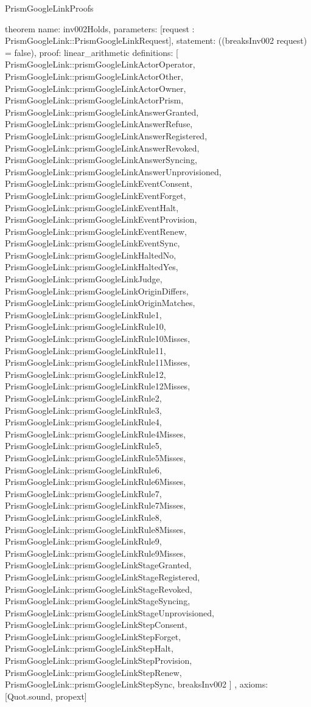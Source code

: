 \begin{lexlean}{PrismGoogleLinkProofs}
\begin{semanticmodule}
theorem{
  name: inv002Holds,
  parameters: [request : PrismGoogleLink::PrismGoogleLinkRequest],
  statement: ((breaksInv002 request) = false),
  proof: linear_arithmetic{
    definitions: [
      PrismGoogleLink::prismGoogleLinkActorOperator,
      PrismGoogleLink::prismGoogleLinkActorOther,
      PrismGoogleLink::prismGoogleLinkActorOwner,
      PrismGoogleLink::prismGoogleLinkActorPrism,
      PrismGoogleLink::prismGoogleLinkAnswerGranted,
      PrismGoogleLink::prismGoogleLinkAnswerRefuse,
      PrismGoogleLink::prismGoogleLinkAnswerRegistered,
      PrismGoogleLink::prismGoogleLinkAnswerRevoked,
      PrismGoogleLink::prismGoogleLinkAnswerSyncing,
      PrismGoogleLink::prismGoogleLinkAnswerUnprovisioned,
      PrismGoogleLink::prismGoogleLinkEventConsent,
      PrismGoogleLink::prismGoogleLinkEventForget,
      PrismGoogleLink::prismGoogleLinkEventHalt,
      PrismGoogleLink::prismGoogleLinkEventProvision,
      PrismGoogleLink::prismGoogleLinkEventRenew,
      PrismGoogleLink::prismGoogleLinkEventSync,
      PrismGoogleLink::prismGoogleLinkHaltedNo,
      PrismGoogleLink::prismGoogleLinkHaltedYes,
      PrismGoogleLink::prismGoogleLinkJudge,
      PrismGoogleLink::prismGoogleLinkOriginDiffers,
      PrismGoogleLink::prismGoogleLinkOriginMatches,
      PrismGoogleLink::prismGoogleLinkRule1,
      PrismGoogleLink::prismGoogleLinkRule10,
      PrismGoogleLink::prismGoogleLinkRule10Misses,
      PrismGoogleLink::prismGoogleLinkRule11,
      PrismGoogleLink::prismGoogleLinkRule11Misses,
      PrismGoogleLink::prismGoogleLinkRule12,
      PrismGoogleLink::prismGoogleLinkRule12Misses,
      PrismGoogleLink::prismGoogleLinkRule2,
      PrismGoogleLink::prismGoogleLinkRule3,
      PrismGoogleLink::prismGoogleLinkRule4,
      PrismGoogleLink::prismGoogleLinkRule4Misses,
      PrismGoogleLink::prismGoogleLinkRule5,
      PrismGoogleLink::prismGoogleLinkRule5Misses,
      PrismGoogleLink::prismGoogleLinkRule6,
      PrismGoogleLink::prismGoogleLinkRule6Misses,
      PrismGoogleLink::prismGoogleLinkRule7,
      PrismGoogleLink::prismGoogleLinkRule7Misses,
      PrismGoogleLink::prismGoogleLinkRule8,
      PrismGoogleLink::prismGoogleLinkRule8Misses,
      PrismGoogleLink::prismGoogleLinkRule9,
      PrismGoogleLink::prismGoogleLinkRule9Misses,
      PrismGoogleLink::prismGoogleLinkStageGranted,
      PrismGoogleLink::prismGoogleLinkStageRegistered,
      PrismGoogleLink::prismGoogleLinkStageRevoked,
      PrismGoogleLink::prismGoogleLinkStageSyncing,
      PrismGoogleLink::prismGoogleLinkStageUnprovisioned,
      PrismGoogleLink::prismGoogleLinkStepConsent,
      PrismGoogleLink::prismGoogleLinkStepForget,
      PrismGoogleLink::prismGoogleLinkStepHalt,
      PrismGoogleLink::prismGoogleLinkStepProvision,
      PrismGoogleLink::prismGoogleLinkStepRenew,
      PrismGoogleLink::prismGoogleLinkStepSync,
      breaksInv002
    ]
  },
  axioms: [Quot.sound, propext]
}


\end{semanticmodule}
\end{lexlean}
